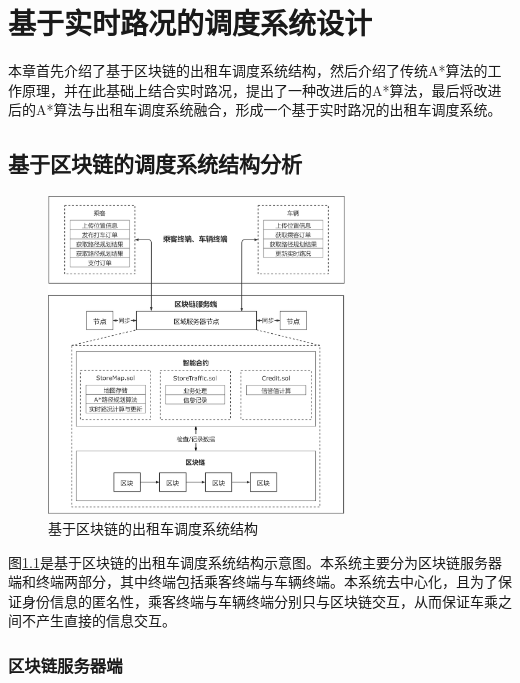 \chapter{基于实时路况的调度系统设计}

本章首先介绍了基于区块链的出租车调度系统结构，然后介绍了传统A*算法的工作原理，并在此基础上结合实时路况，提出了一种改进后的A*算法，最后将改进后的A*算法与出租车调度系统融合，形成一个基于实时路况的出租车调度系统。

\section{基于区块链的调度系统结构分析}

\begin{figure}[ht]
  \centering
  \includegraphics[width=0.7\textwidth]{undergraduate-thesis/images/sysstructure.png}
  \caption{基于区块链的出租车调度系统结构}
  \label{pic-sysstructure} %
\end{figure}

图\ref{pic-sysstructure}是基于区块链的出租车调度系统结构示意图。本系统主要分为区块链服务器端和终端两部分，其中终端包括乘客终端与车辆终端。本系统去中心化，且为了保证身份信息的匿名性，乘客终端与车辆终端分别只与区块链交互，从而保证车乘之间不产生直接的信息交互。

\subsection{区块链服务器端}

